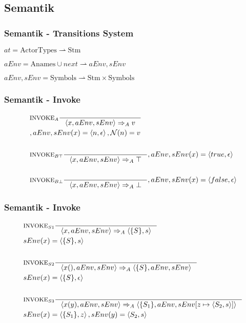 \subsection{Semantik}
\begin{frame}
	\frametitle{Semantik - Transitions System}
	\begin{center}	
  $at = \text{ActorTypes} \rightharpoonup \text{Stm}$
	
	$aEnv = \text{Anames} \cup {next} \rightharpoonup aEnv,sEnv$
	
	$aEnv,sEnv = \text{Symbols} \rightharpoonup \text{Stm} \times \text{Symbols}$
  \end{center}
\end{frame}

\begin{frame}
	\frametitle{Semantik - Invoke}
	\begin{align*}
	&\inference[$\text{INVOKE}_{A}$]{}
                  {\Braket{x,aEnv,sEnv} \Rightarrow_A v}
                  \\
									&{,aEnv,sEnv(x) = \Braket{n,\epsilon}, \mathcal{N}(n) = v}
	\\\\
	&\inference[$\text{INVOKE}_{B\top}$]{}
                  {\Braket{x,aEnv,sEnv} \Rightarrow_A \top}
                  {,aEnv,sEnv(x) = \Braket{true,\epsilon}}
	\\\\
	&\inference[$\text{INVOKE}_{B\bot}$]{}
                  {\Braket{x,aEnv,sEnv} \Rightarrow_A \bot}
                  {,aEnv,sEnv(x) = \Braket{false,\epsilon}}
	\end{align*}
\end{frame}

\begin{frame}
  \frametitle{Semantik - Invoke}
  \begin{align*}
	&\inference[$\text{INVOKE}_{S1}$]{}
                  {\Braket{x,aEnv,sEnv} \Rightarrow_A \Braket{\{S\},s}}
									\\
                  &{sEnv(x) = \Braket{\{S\},s}}
	\\\\
	&\inference[$\text{INVOKE}_{S2}$]{}
                  {\Braket{x(),aEnv,sEnv} \Rightarrow_A \Braket{\{S\},aEnv,sEnv}}
									\\
                  &{sEnv(x) = \Braket{\{S\},\epsilon}}
	\\\\
	&\inference[$\text{INVOKE}_{S3}$]{}
                  {\Braket{x(y),aEnv,sEnv} \Rightarrow_A \Braket{\{S_1\},aEnv,sEnv[z \mapsto \Braket{S_2,s}]}}
                  \\
					        &{sEnv(x) = \Braket{\{S_1\},z}, sEnv(y) = \Braket{S_2,s}}
	\end{align*}
\end{frame}
